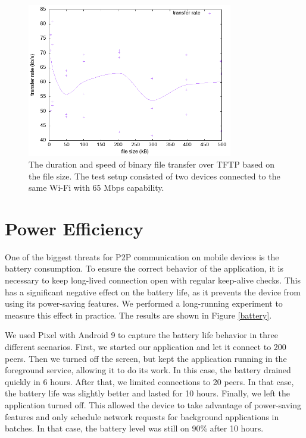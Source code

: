 \begin{figure}[h!]
    \centering
    \includegraphics[width=0.8\textwidth]{plots/tftp}
    \caption{The duration and speed of binary file transfer over TFTP based on the file size. The test setup consisted of two devices connected to the same Wi-Fi with 65 Mbps capability.}
    \label{tftp_plot}
\end{figure}


\section{Power Efficiency}

One of the biggest threats for P2P communication on mobile devices is the battery consumption. To ensure the correct behavior of the application, it is necessary to keep long-lived connection open with regular keep-alive checks. This has a significant negative effect on the battery life, as it prevents the device from using its power-saving features. We performed a long-running experiment to measure this effect in practice. The results are shown in Figure \ref{battery}.

We used Pixel with Android 9 to capture the battery life behavior in three different scenarios. First, we started our application and let it connect to 200 peers. Then we turned off the screen, but kept the application running in the foreground service, allowing it to do its work. In this case, the battery drained quickly in 6 hours. After that, we limited connections to 20 peers. In that case, the battery life was slightly better and lasted for 10 hours. Finally, we left the application turned off. This allowed the device to take advantage of power-saving features and only schedule network requests for background applications in batches. In that case, the battery level was still on 90\% after 10 hours.

